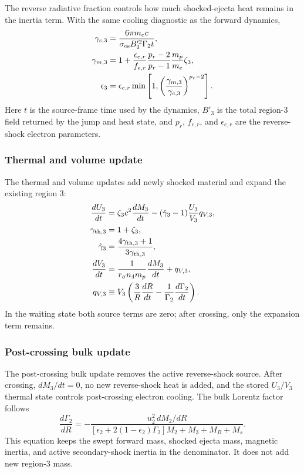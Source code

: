 \documentclass[twocolumn]{aastex702}
\begin{document}
The reverse radiative fraction controls how much shocked-ejecta heat remains in
the inertia term.  With the same cooling diagnostic as the forward dynamics,
\begin{equation}
\begin{aligned}
\gamma_{c,3}&=\frac{6\pi m_ec}
{\sigma_{\rm es} B_3^{\prime 2}\Gamma_2t},\\
\gamma_{m,3}&=1+
\frac{\epsilon_{e,r}}{f_{e,r}}
\frac{p_r-2}{p_r-1}
\frac{m_p}{m_e}\zeta_3,\\
\epsilon_3&=\epsilon_{e,r}\min\left[
1,\left(\frac{\gamma_{m,3}}{\gamma_{c,3}}\right)^{p_r-2}
\right].
\end{aligned}
\end{equation}
Here \(t\) is the source-frame time used by the dynamics, \(B'_3\) is the total
region-3 field returned by the jump and heat state, and \(p_r\), \(f_{e,r}\), and
\(\epsilon_{e,r}\) are the reverse-shock electron parameters.

\subsubsection{Thermal and volume update}

The thermal and volume updates add newly shocked material and expand the existing
region 3:
\begin{equation}
\begin{aligned}
\frac{dU_3}{dt}&=\zeta_3c^2\frac{dM_3}{dt}
-(\hat{\gamma}_{3}-1)\frac{U_3}{V_3}q_{V,3},\\
\gamma_{{\rm th},3}&=1+\zeta_3,\\
\hat{\gamma}_{3}&=
\frac{4\gamma_{{\rm th},3}+1}{3\gamma_{{\rm th},3}},\\
\frac{dV_3}{dt}&=\frac{1}{r_\sigma n_4m_p}\frac{dM_3}{dt}
+q_{V,3},\\
q_{V,3}&\equiv V_3\left(\frac{3}{R}\frac{dR}{dt}
-\frac{1}{\Gamma_2}\frac{d\Gamma_2}{dt}\right).
\end{aligned}
\end{equation}
In the waiting state both source terms are zero; after crossing, only the
expansion term remains.

\subsubsection{Post-crossing bulk update}

The post-crossing bulk update removes the active reverse-shock source.  After
crossing, \(dM_3/dt=0\), no new reverse-shock heat is added, and the stored
\(U_3/V_3\) thermal state controls post-crossing electron cooling.  The bulk
Lorentz factor follows
\begin{equation}
\frac{d\Gamma_2}{dR}
=-\frac{u_2^2\,dM_2/dR}
{[\epsilon_2+2(1-\epsilon_2)\Gamma_2]M_2+M_3+M_B+M_s}.
\end{equation}
This equation keeps the swept forward mass, shocked ejecta mass, magnetic
inertia, and active secondary-shock inertia in the denominator.  It does not add
new region-3 mass.
\end{document}

